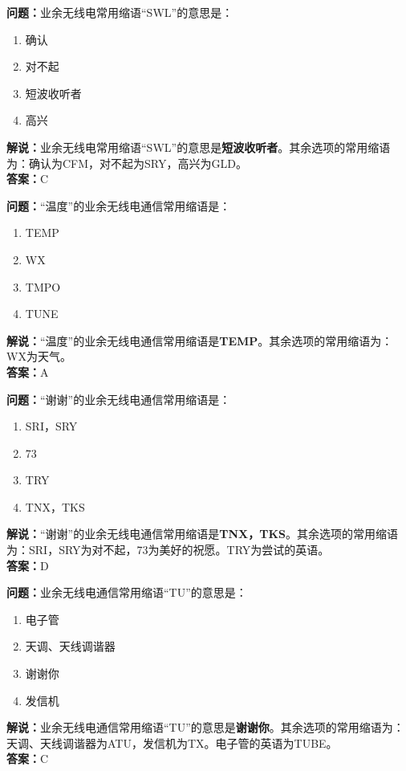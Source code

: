 \bigskip


\noindent\textbf{问题：}业余无线电常用缩语“SWL”的意思是：
\begin{enumerate}[label=\Alph*), leftmargin=3em]
\item 确认
\item 对不起
\item 短波收听者
\item 高兴
\end{enumerate}
\noindent\textbf{解说：}业余无线电常用缩语“SWL”的意思是\textbf{短波收听者}。其余选项的常用缩语为：确认为CFM，对不起为SRY，高兴为GLD。\\\noindent\textbf{答案：}C



\bigskip


\noindent\textbf{问题：}“温度”的业余无线电通信常用缩语是：
\begin{enumerate}[label=\Alph*), leftmargin=3em]
\item TEMP
\item WX
\item TMPO
\item TUNE
\end{enumerate}
\noindent\textbf{解说：}“温度”的业余无线电通信常用缩语是\textbf{TEMP}。其余选项的常用缩语为：WX为天气。\\\noindent\textbf{答案：}A


\bigskip


\noindent\textbf{问题：}“谢谢”的业余无线电通信常用缩语是：
\begin{enumerate}[label=\Alph*), leftmargin=3em]
\item SRI，SRY
\item 73
\item TRY
\item TNX，TKS
\end{enumerate}
\noindent\textbf{解说：}“谢谢”的业余无线电通信常用缩语是\textbf{TNX，TKS}。其余选项的常用缩语为：SRI，SRY为对不起，73为美好的祝愿。TRY为尝试的英语。\\\noindent\textbf{答案：}D



\bigskip


\noindent\textbf{问题：}业余无线电通信常用缩语“TU”的意思是：
\begin{enumerate}[label=\Alph*), leftmargin=3em]
\item 电子管
\item 天调、天线调谐器
\item 谢谢你
\item 发信机
\end{enumerate}
\noindent\textbf{解说：}业余无线电通信常用缩语“TU”的意思是\textbf{谢谢你}。其余选项的常用缩语为：天调、天线调谐器为ATU，发信机为TX。电子管的英语为TUBE。\\\noindent\textbf{答案：}C

